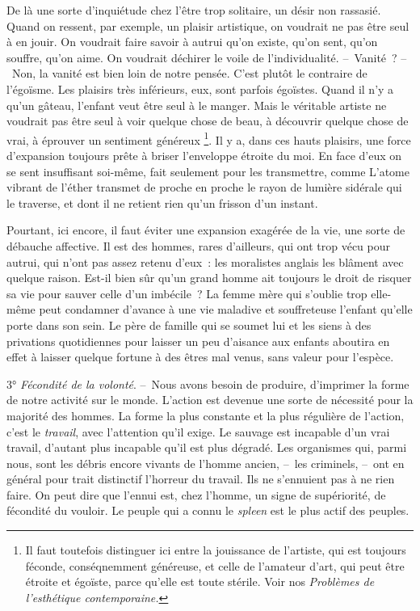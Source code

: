 \documentclass[french,twoside]{book} %
\begin{document}
De là une sorte d’inquiétude chez l’être trop solitaire, un désir non rassasié. Quand on ressent, par exemple, un plaisir artistique, on voudrait ne pas être seul à en jouir. On voudrait faire savoir à autrui qu’on existe, qu’on sent, qu’on souffre, qu’on aime. On voudrait déchirer le voile de l’individualité. – Vanité ? – Non, la vanité est bien loin de notre pensée. C’est plutôt le contraire de l’égoïsme. Les plaisirs très inférieurs, eux, sont parfois égoïstes. Quand il n’y a qu’un gâteau, l’enfant veut être seul à le manger. Mais le véritable artiste ne voudrait pas être seul à voir quelque chose de beau, à découvrir quelque chose de vrai, à éprouver un sentiment généreux \footnote{Il faut toutefois distinguer ici entre la jouissance de l’artiste, qui est toujours féconde, conséqnemment généreuse, et celle de l’amateur d’art, qui peut être étroite et égoïste, parce qu’elle est toute stérile. Voir nos \emph{Problèmes de l’esthétique contemporaine.}}. Il y a, dans ces hauts plaisirs, une force d’expansion toujours prête à briser l’enveloppe étroite du moi. En face d’eux on se sent insuffisant soi-même, fait seulement pour les transmettre, comme L’atome vibrant de l’éther transmet de proche en proche le rayon de lumière sidérale qui le traverse, et dont il ne retient rien qu’un frisson d’un instant.\par
Pourtant, ici encore, il faut éviter une expansion exagérée de la vie, une sorte de débauche affective. Il est des hommes, rares d’ailleurs, qui ont trop vécu pour autrui, qui n’ont pas assez retenu d’eux : les moralistes anglais les blâment avec quelque raison. Est-il bien sûr qu’un grand homme ait toujours le droit de risquer sa vie pour sauver celle d’un imbécile ? La femme mère qui s’oublie trop elle-même peut condamner d’avance à une vie maladive et souffreteuse l’enfant qu’elle porte dans son sein. Le père de famille qui se soumet lui et les siens à des privations quotidiennes pour laisser un peu d’aisance aux enfants aboutira en effet à laisser quelque fortune à des êtres mal venus, sans valeur pour l’espèce.\par
3° \emph{Fécondité de la volonté}. – Nous avons besoin de produire, d’imprimer la forme de notre activité sur le monde. L’action est devenue une sorte de nécessité pour la majorité des hommes. La forme la plus constante et la plus régulière de l’action, c’est le \emph{travail}, avec l’attention qu’il exige. Le sauvage est incapable d’un vrai travail, d’autant plus incapable qu’il est plus dégradé. Les organismes qui, parmi nous, sont les débris encore vivants de l’homme ancien, – les criminels, – ont en général pour trait distinctif l’horreur du travail. Ils ne s’ennuient pas à ne rien faire. On peut dire que l’ennui est, chez l’homme, un signe de supériorité, de fécondité du vouloir. Le peuple qui a connu le \emph{spleen} est le plus actif des peuples.\par
\end{document}
